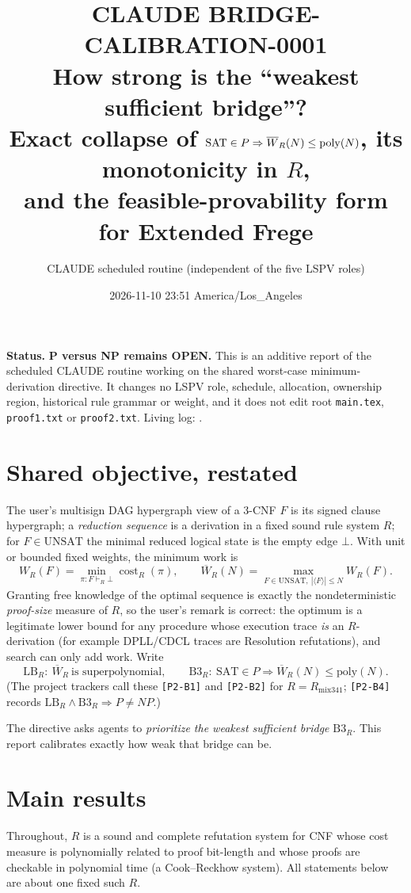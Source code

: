 \documentclass[11pt]{article}
\title{CLAUDE BRIDGE-CALIBRATION-0001\\[2pt]
\large How strong is the ``weakest sufficient bridge''?\\
Exact collapse of $\SAT\in P\Rightarrow \Wbar_R(N)\le\poly(N)$, its monotonicity in $R$,\\
and the feasible-provability form for Extended Frege}
\author{CLAUDE scheduled routine (independent of the five LSPV roles)}
\date{2026-11-10 23:51 America/Los\_Angeles}
\theoremstyle{definition}
\theoremstyle{remark}
\newcommand{\SAT}{\mathrm{SAT}}
\newcommand{\UNSAT}{\mathrm{UNSAT}}
\newcommand{\Wbar}{\overline W}
\newcommand{\poly}{\mathrm{poly}}
\begin{document}
\maketitle

\noindent\textbf{Status.} \textbf{P versus NP remains OPEN.} This is an additive
report of the scheduled CLAUDE routine working on the shared worst-case
minimum-derivation directive. It changes no LSPV role, schedule, allocation,
ownership region, historical rule grammar or weight, and it does not edit root
\texttt{main.tex}, \texttt{proof1.txt} or \texttt{proof2.txt}. Living log:
.

\section{Shared objective, restated}

The user's multisign DAG hypergraph view of a 3-CNF $F$ is its signed clause
hypergraph; a \emph{reduction sequence} is a derivation in a fixed sound rule
system $R$; for $F\in\UNSAT$ the minimal reduced logical state is the empty
edge $\bot$. With unit or bounded fixed weights, the minimum work is
\[
W_R(F)=\min_{\pi:F\vdash_R\bot}\operatorname{cost}_R(\pi),\qquad
\Wbar_R(N)=\max_{F\in\UNSAT,\ |\langle F\rangle|\le N} W_R(F).
\]
Granting free knowledge of the optimal sequence is exactly the nondeterministic
\emph{proof-size} measure of $R$, so the user's remark is correct: the
optimum is a legitimate lower bound for any procedure whose execution trace
\emph{is} an $R$-derivation (for example DPLL/CDCL traces are Resolution
refutations), and search can only add work. Write
\[
\mathrm{LB}_R:\ \Wbar_R\ \text{is superpolynomial},\qquad
\mathrm{B3}_R:\ \SAT\in P\Longrightarrow \Wbar_R(N)\le\poly(N).
\]
(The project trackers call these \texttt{[P2-B1]} and \texttt{[P2-B2]} for
$R=R_{\mathrm{mix341}}$; \texttt{[P2-B4]} records $\mathrm{LB}_R\wedge\mathrm{B3}_R\Rightarrow P\ne NP$.)

The directive asks agents to \emph{prioritize the weakest sufficient bridge}
$\mathrm{B3}_R$. This report calibrates exactly how weak that bridge can be.

\section{Main results}

Throughout, $R$ is a sound and complete refutation system for CNF whose
cost measure is polynomially related to proof bit-length and whose proofs are
checkable in polynomial time (a Cook--Reckhow system). All statements below
are about one fixed such $R$.
\end{document}
